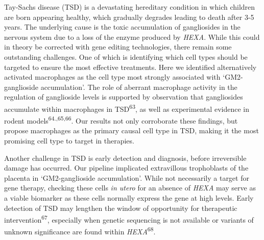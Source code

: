 \documentclass[
]{article}
\begin{document}
Tay-Sachs disease (TSD) is a devastating hereditary condition in which
children are born appearing healthy, which gradually degrades leading to
death after 3-5 years. The underlying cause is the toxic accumulation of
gangliosides in the nervous system due to a loss of the enzyme produced
by \emph{HEXA}. While this could in theory be corrected with gene
editing technologies, there remain some outstanding challenges. One of
which is identifying which cell types should be targeted to ensure the
most effective treatments. Here we identified alternatively activated
macrophages as the cell type most strongly associated with
`GM2-ganglioside accumulation'. The role of aberrant macrophage activity
in the regulation of ganglioside levels is supported by observation that
gangliosides accumulate within macrophages in TSD\textsuperscript{63},
as well as experimental evidence in rodent
models\textsuperscript{64.,65,66}. Our results not only corroborate
these findings, but propose macrophages as the primary causal cell type
in TSD, making it the most promising cell type to target in therapies.

Another challenge in TSD is early detection and diagnosis, before
irreversible damage has occurred. Our pipeline implicated extravillous
trophoblasts of the placenta in `GM2-ganglioside accumulation'. While
not necessarily a target for gene therapy, checking these cells \emph{in
utero} for an absence of \emph{HEXA} may serve as a viable biomarker as
these cells normally express the gene at high levels. Early detection of
TSD may lengthen the window of opportunity for therapeutic
intervention\textsuperscript{67}, especially when genetic sequencing is
not available or variants of unknown significance are found within
\emph{HEXA}\textsuperscript{68}.
\end{document}
